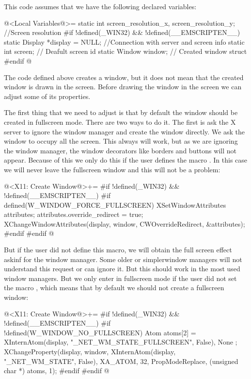 This code assumes that we have the following declared variables:

\iniciocodigo
@<Local Variables@>=
static int screen_resolution_x, screen_resolution_y; //Screen resolution
#if !defined(_WIN32) && !defined(__EMSCRIPTEN__)
static Display *display = NULL; //Connection with server and screen info
static int screen;       // Deafult screen id
static Window window;    // Created window struct
#endif
@
\fimcodigo

The code defined above creates a window, but it does not mean that the
created window is drawn in the screen. Before drawing the window in
the screen we can adjust some of its properties.

The first thing that we need to adjust is that by default the window
should be created in fullscreen mode. There are two ways to do it. The
first is ask the X server to ignore the window manager and create the
window directly. We ask the window to occupy all the screen. This
always will work, but as we are ignoring the window manager, the
window decorators like borders and buttons will not appear. Because of
this we only do this if the user defines the
macro . In this case we will
never leave the fullscreen window and this will not be a problem:

\iniciocodigo
@<X11: Create Window@>+=
#if !defined(_WIN32) && !defined(__EMSCRIPTEN__)
#if defined(W_WINDOW_FORCE_FULLSCREEN)
{
  XSetWindowAttributes attributes;
  attributes.override_redirect = true;
  XChangeWindowAttributes(display, window, CWOverrideRedirect,
                          &attributes);
}
#endif
#endif
@
\fimcodigo

But if the user did not define this macro, we will obtain the full
screen effect askinf for the window manager. Some older or
simplerwindow managers will not understand this request or can ignore
it. But this should work in the most used window managers. But we only
enter in fullscreen mode if the user did not set the
macro , which means that by default we should not create a fullscreen window:

\iniciocodigo
@<X11: Create Window@>+=
#if !defined(_WIN32) && !defined(__EMSCRIPTEN__)
#if !defined(W_WINDOW_NO_FULLSCREEN)
{
  Atom atoms[2] = { XInternAtom(display, "_NET_WM_STATE_FULLSCREEN",
                                False), None };
  XChangeProperty(display, window, XInternAtom(display, "_NET_WM_STATE",
                                               False),
                  XA_ATOM, 32, PropModeReplace, (unsigned char *) atoms, 1);
}
#endif
#endif
@
\fimcodigo

